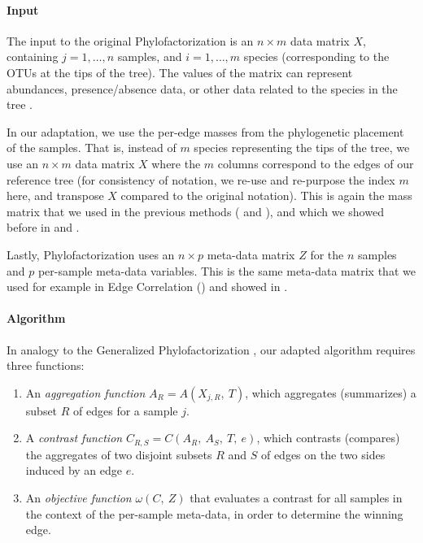 \paragraph{Input}
\label{ch:Factorization:sec:Methods:sub:Phylofactor:par:Input}

The input to the original Phylofactorization is an $n \times m$ data matrix $X$,
containing $j = 1, \ldots, n$ samples, and $i = 1, \ldots, m$ species (corresponding to the OTUs at the tips of the tree).
The values of the matrix can represent abundances, presence/absence data, 
or other data related to the species in the tree \cite{Washburne2019}.

In our adaptation, we use the per-edge masses from the phylogenetic placement of the samples.
That is, instead of $m$ species representing the tips of the tree,
we use an $n \times m$ data matrix $X$ where the $m$ columns correspond to the edges of our reference tree
(for consistency of notation, we re-use and re-purpose the index $m$ here,
and transpose $X$ compared to the original notation).
This is again the mass matrix that we used in the previous methods ( and ),
and which we showed before in  and .

Lastly, Phylofactorization uses an $n \times p$ meta-data matrix $Z$ for the $n$ samples
and $p$ per-sample meta-data variables.
This is the same meta-data matrix that we used for example in Edge Correlation
() and showed in .


\paragraph{Algorithm}
\label{ch:Factorization:sec:Methods:sub:Phylofactor:par:Algorithm}

In analogy to the Generalized Phylofactorization \cite{Washburne2018,Washburne2019},
our adapted algorithm requires three functions:

\begin{enumerate}
    \item An \emph{aggregation function} $A_R = A( X_{j,R}, ~T )$,
          which aggregates (summarizes) a subset $R$ of edges for a sample $j$.
    \item A \emph{contrast function} $C_{R,S} = C( A_R, ~A_S, ~T, ~e )$, which contrasts (compares)
          the aggregates of two disjoint subsets $R$ and $S$ of edges on the two sides induced by an edge $e$.
    \item An \emph{objective function} $\omega(C, ~Z)$ that evaluates a contrast for all samples
          in the context of the per-sample meta-data, in order to determine the winning edge.
\end{enumerate}

